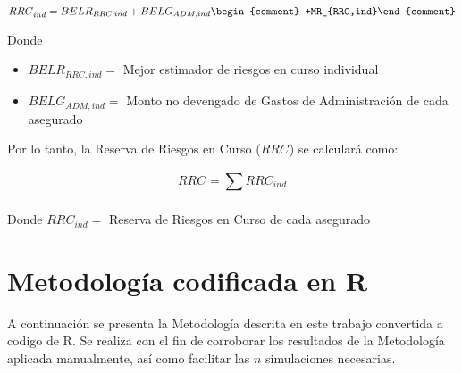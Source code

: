 \documentclass[11pt,twoside,openright,spanish]{report}
\numberwithin{equation}{chapter}
\numberwithin{figure}{chapter}
\numberwithin{table}{chapter}
\begin{document}
\begin{equation}
		{RRC}_{ind}^{}={{BELR}_{RRC,ind}+BELG_{ADM,ind} \begin{comment} +MR_{RRC,ind}\end{comment}
		}
	\label{eq20}
		\end{equation}	
			
	Donde
	 
		\begin{itemize}
		\setlength\itemsep{-0.5em}
	\item $BELR_{RRC,ind}=$ Mejor estimador de riesgos en curso individual
	
	\item $BELG_{ADM,ind}^{}=$ Monto no devengado de Gastos de Administración de cada asegurado
	\end{itemize}
	
	\begin{comment}
	$MR_{RRC,ind}^{}=$ Margen de Riesgo de la reserva de riesgos en curso calculado anteriormente
	\end{comment}
		
	Por lo tanto, la Reserva de Riesgos en Curso ($RRC_{}$) se calculará como:
	
\begin{equation}
		RRC_{}={\sum _{}^{}RRC_{ind}^{}}
		\label{eq21}
	\end{equation}
		
	
	Donde $RRC_{ind}^{}=$ Reserva de Riesgos en Curso de cada asegurado
	


 

\clearpage
\appendix 

\fancyhead[LO]{}
\fancyhead[RE]{}
\pagestyle{fancy}

\chapter{Metodología codificada en R }\label{desarrolloconstadm}

A continuación se presenta la Metodología descrita en este trabajo convertida a codigo de R. Se realiza con el fin de corroborar los resultados de la Metodología aplicada manualmente, así como facilitar las $n$ simulaciones necesarias.
\end{document}
